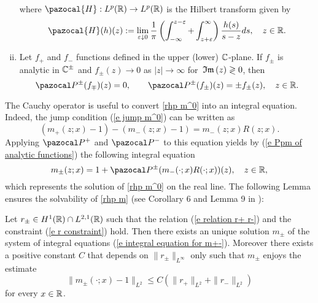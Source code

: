 \begin{prop}
\begin{enumerate}[(i)]
\begin{equation}
\begin{aligned}
        \end{aligned}
      \end{equation}
      where $\pazocal{H}:L^p(\Real)\to L^p(\Real)$ is the Hilbert transform given by
      \begin{equation*}
        \pazocal{H}(h)(z):=\lim_{\eps\downarrow 0}\frac{1}{\pi}\left(\int_{-\infty}^{z-\eps}+ \int^{\infty}_{z+\eps}\right) \frac{h(s)}{s-z}ds,\quad z\in\Real.
      \end{equation*}
      \item Let $f_+$ and $f_-$ functions defined in the upper (lower) $\mathbb C$-plane. If $f_{\pm}$ is analytic in $\mathbb C^{\pm}$ and $f_{\pm}(z)\to 0$ as $|z|\to\infty$ for $\,\mathfrak{Im}\,(z)\gtrless0$, then
          \begin{equation}\label{e Ppm of analytic functions}
            \Ppm(f_{\mp})(z)=0,\qquad\Ppm(f_{\pm})(z)=\pm f_{\pm}(z),\quad z\in\Real.
          \end{equation}
    \end{enumerate}
\end{prop}
The Cauchy operator is useful to convert \rh \ref{rhp m^0} into an integral equation. Indeed, the jump condition (\ref{e jump m^0}) can be written as
\begin{equation*}
    (m_+(z;x)-1)-(m_-(z;x)-1)=m_-(z;x)R(z;x).
\end{equation*}
Applying $\Pp$ and $\Pm$ to this equation yields by (\ref{e Ppm of analytic functions}) the following integral equation
\begin{equation}\label{e integral equation for m+-}
    m_{\pm}(z;x)=1+\Ppm(m_-(\cdot;x)R(\cdot;x))(z),\quad z\in\Real,
\end{equation}
which represents the solution of \rh \ref{rhp m^0} on the real line. The following Lemma ensures the solvability of \rh \ref{rhp m} (see Corollary 6 and Lemma 9 in \cite{Pelinovsky2016}):
\begin{lem}\label{l solvability of RHP N=0}
    Let $r_{\pm}\in H^1(\mathbb R)\cap L^{2,1}(\mathbb R)$ such that the relation (\ref{e relation r+ r-}) and the constraint (\ref{e r constraint}) hold. Then there exists an unique solution $m_{\pm}$ of the system of integral equations (\ref{e integral equation for m+-}). Moreover there exists a positive constant $C$ that depends on $\|r_{\pm}\|_{L^{\infty}}$ only such that $m_{\pm}$ enjoys the estimate
    \begin{equation*}
        \|m_{\pm}(\cdot;x)-1\|_{L^2}\leq C(\|r_{+}\|_{L^2} +\|r_{-}\|_{L^2})
    \end{equation*}
    for every $x\in\mathbb R$.
\end{lem}
